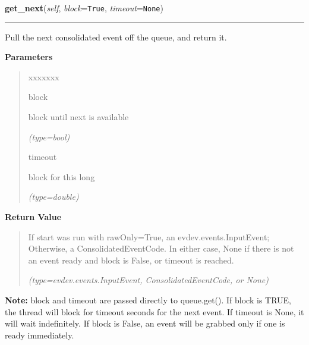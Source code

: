 \hspace{.8\funcindent}\begin{boxedminipage}{\funcwidth}

    \raggedright \textbf{get\_next}(\textit{self}, \textit{block}={\tt True}, \textit{timeout}={\tt None})

    \vspace{-1.5ex}

    \rule{\textwidth}{0.5\fboxrule}
\setlength{\parskip}{2ex}
    Pull the next consolidated event off the queue, and return it.

\setlength{\parskip}{1ex}
      \textbf{Parameters}
      \vspace{-1ex}

      \begin{quote}
        \begin{Ventry}{xxxxxxx}

          \item[block]

          block until next is available

            {\it (type=bool)}

          \item[timeout]

          block for this long

            {\it (type=double)}

        \end{Ventry}

      \end{quote}

      \textbf{Return Value}
    \vspace{-1ex}

      \begin{quote}
      If start was run with rawOnly=True, an evdev.events.InputEvent; 
      Otherwise, a ConsolidatedEventCode. In either case, None if there is 
      not an event ready and block is False, or timeout is reached.

      {\it (type=evdev.events.InputEvent, ConsolidatedEventCode, or None)}

      \end{quote}

\textbf{Note:} block and timeout are passed directly to queue.get(). If block is TRUE, the
thread will block for timeout seconds for the next event. If timeout is 
None, it will wait indefinitely. If block is False, an event will be 
grabbed only if one is ready immediately.



    \end{boxedminipage}

